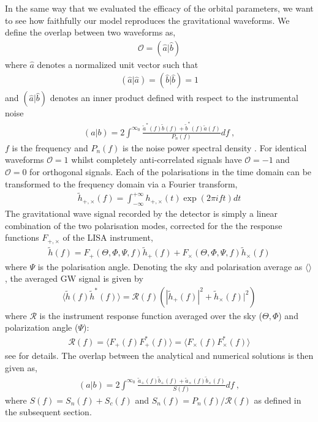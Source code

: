 \documentclass[a4paper,fleqn,usenatbib]{mnras}
\begin{document}
\noindent In the same way that we evaluated the efficacy of the orbital parameters, we want to see how faithfully our model reproduces the gravitational waveforms. We define the overlap between two waveforms as,
\begin{eqnarray}
\mathcal{O} = (\hat{a}|\hat{b})
\end{eqnarray}
where $\hat{a}$ denotes a normalized unit vector such that
\begin{eqnarray}
(\hat{a}|\hat{a}) = (\hat{b}|\hat{b}) = 1
\end{eqnarray}
and $(\hat{a}|\hat{b})$ denotes an inner product defined with respect to the instrumental noise 
\begin{eqnarray}
(a|b) = 2 \int^{\infty_0} \frac{\tilde{a}^*(f)\tilde{b}(f)+\tilde{b}^*(f)\tilde{a}(f)}{P_n(f)} df \ ,
\end{eqnarray}
$f$ is the frequency and $P_n(f)$ is the noise power spectral density \citep[PSD, ][]{Cutler1994}. For identical waveforms $\mathcal{O} = 1$ whilst completely anti-correlated signals have $\mathcal{O} = -1 $ and $\mathcal{O} = 0$ for orthogonal signals. Each of the polarisations in the time domain can be transformed to the frequency domain via a Fourier transform,
\begin{eqnarray}
\tilde{h}_{+, \times}(f)  = \int_{- \infty}^{+\infty} h_{+, \times}(t) \exp(2 \pi i f t) dt
\end{eqnarray}
The gravitational wave signal recorded by the detector is simply a linear combination of the two polarisation modes, corrected for the the response functions $F_{+, \times}$ of the LISA instrument,
\begin{eqnarray}
\tilde{h}(f) = F_+(\Theta, \Phi, \Psi, f) \tilde{h}_+(f) + F_{\times}(\Theta, \Phi, \Psi, f) \tilde{h}_{\times}(f)
\end{eqnarray}
where $\Psi$ is the polarisation angle. Denoting the sky and polarisation average as $\langle \rangle$, the averaged GW signal is given by
\begin{eqnarray}
\langle \tilde{h}(f) \tilde{h}^*(f) \rangle = \mathcal{R}(f) \left( |\tilde{h}_+(f)|^2 + \tilde{h}_{\times}(f)|^2  \right)
\end{eqnarray}
where $\mathcal{R}$ is the instrument response function averaged over the sky ($\Theta, \Phi$) and polarization angle ($\Psi$): 
\begin{eqnarray}
\mathcal{R} (f) = \langle F_{+} (f) F_{+}^*(f) \rangle =\langle F_{\times} (f) F_{\times}^*(f) \rangle
\end{eqnarray}
see \citet{Robson2019} for details. The overlap between the analytical and numerical solutions is then given as,
\begin{eqnarray}
(a|b) = 2 \int^{\infty_0} \frac{\tilde{a}_+(f) \tilde{b}_+(f) +\tilde{a}_{\times}(f) \tilde{b}_{\times}(f)  }{S(f)} df \ ,
\end{eqnarray}
where $S(f) = S_n(f) + S_c(f)$ and $S_n (f)= P_n(f) / \mathcal{R}(f)$ as defined in the subsequent section.
\end{document}
